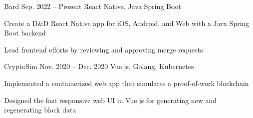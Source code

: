 \fontdir[fonts/]

\begin{cvprojects}

  \cvproject
  {Bard}
  {\href{https://gitlab.com/drexel_se/senior_project/ay22_bard/bard}{\faGithubSquare\acvHeaderIconSep\@KevinIsMyName}}
  {Sep. 2022 -- Present}
  {React Native, Java Spring Boot}
  {
    \begin{cvitems}
      \item Create a D\&D React Native app for iOS, Android, and Web with a Java Spring Boot backend
      \item Lead frontend efforts by reviewing and approving merge requests
    \end{cvitems}
  }



  \cvproject
  {CryptoSim}
  {\href{https://github.com/jzlotek/bc}{\faGithubSquare\acvHeaderIconSep\@KevinIsMyName}}
  {Nov. 2020 -- Dec. 2020}
  {Vue.js, Golang, Kubernetes}
  {
    \begin{cvitems}
      \item Implemented a containerized web app that simulates a proof-of-work blockchain
      \item Designed the fast responsive web UI in Vue.js for generating new and regenerating block data
    \end{cvitems}
  }



\end{cvprojects}

